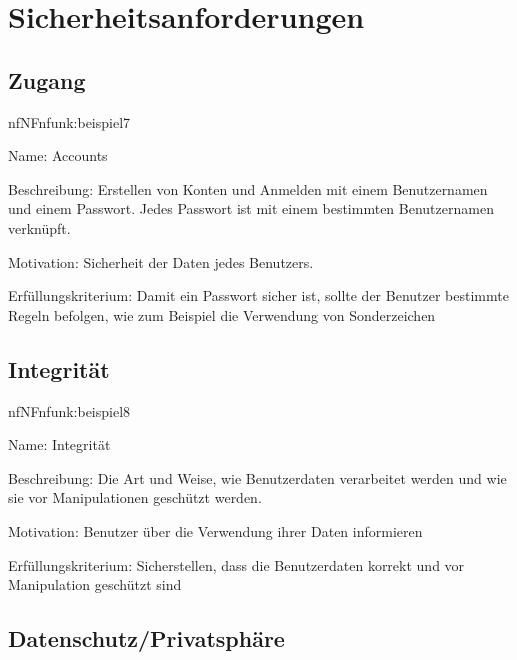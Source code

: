 \section{Sicherheitsanforderungen}

\subsection{Zugang}

\begin{description}[leftmargin=5em, style=sameline]	
	\begin{lhp}{nf}{NF}{nfunk:beispiel7}
		\item [Name:] Accounts
		\item [Beschreibung:] Erstellen von Konten und Anmelden mit einem Benutzernamen und einem Passwort. Jedes Passwort ist mit einem bestimmten Benutzernamen verknüpft.
		\item [Motivation:] Sicherheit der Daten jedes Benutzers.
		\item [Erfüllungskriterium:] Damit ein Passwort sicher ist, sollte der Benutzer bestimmte Regeln befolgen, wie zum Beispiel die Verwendung von Sonderzeichen
	\end{lhp}
\end{description}

\subsection{Integrität}

\begin{description}[leftmargin=5em, style=sameline]	
	\begin{lhp}{nf}{NF}{nfunk:beispiel8}
		\item [Name:] Integrität
		\item [Beschreibung:] Die Art und Weise, wie Benutzerdaten verarbeitet werden und wie sie vor Manipulationen geschützt werden.
		\item [Motivation:] Benutzer über die Verwendung ihrer Daten informieren
		\item [Erfüllungskriterium:] Sicherstellen, dass die Benutzerdaten korrekt und vor Manipulation geschützt sind
	\end{lhp}
\end{description}

\subsection{Datenschutz/Privatsphäre}

